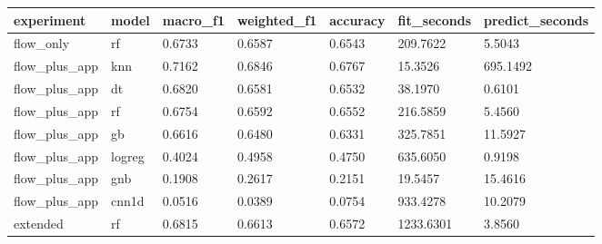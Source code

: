 \begin{tabular}{lllllll}
\toprule
   experiment &  model & macro\_f1 & weighted\_f1 & accuracy & fit\_seconds & predict\_seconds \\
\midrule
    flow\_only &     rf &   0.6733 &      0.6587 &   0.6543 &    209.7622 &          5.5043 \\
flow\_plus\_app &    knn &   0.7162 &      0.6846 &   0.6767 &     15.3526 &        695.1492 \\
flow\_plus\_app &     dt &   0.6820 &      0.6581 &   0.6532 &     38.1970 &          0.6101 \\
flow\_plus\_app &     rf &   0.6754 &      0.6592 &   0.6552 &    216.5859 &          5.4560 \\
flow\_plus\_app &     gb &   0.6616 &      0.6480 &   0.6331 &    325.7851 &         11.5927 \\
flow\_plus\_app & logreg &   0.4024 &      0.4958 &   0.4750 &    635.6050 &          0.9198 \\
flow\_plus\_app &    gnb &   0.1908 &      0.2617 &   0.2151 &     19.5457 &         15.4616 \\
flow\_plus\_app &  cnn1d &   0.0516 &      0.0389 &   0.0754 &    933.4278 &         10.2079 \\
     extended &     rf &   0.6815 &      0.6613 &   0.6572 &   1233.6301 &          3.8560 \\
\bottomrule
\end{tabular}
